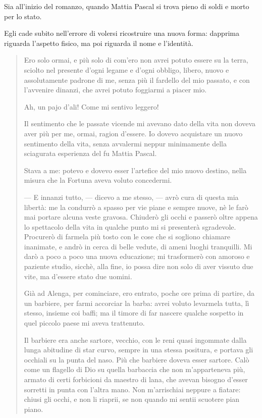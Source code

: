 \documentclass[a4paper, twoside, titlepage]{book}
\newcounter{mar}
\begin{document}
Sia all'inizio del romanzo, quando Mattia Pascal si trova pieno di soldi e morto per lo stato.

Egli cade subito nell'errore di volersi ricostruire una nuova forma: dapprima riguarda l'aspetto fisico, ma poi riguarda il nome e l'identità.

\begin{quotation}
Ero solo ormai, e più solo di com’ero non avrei potuto essere su la terra, sciolto nel presente d’ogni legame e d’ogni obbligo, libero, nuovo e assolutamente padrone di me, senza più il fardello del mio passato, e con l’avvenire dinanzi, che avrei potuto foggiarmi a piacer mio.

Ah, un pajo d’ali! Come mi sentivo leggero!

Il sentimento che le passate vicende mi avevano dato della vita non doveva aver più per me, ormai, ragion d’essere. Io dovevo acquistare un nuovo sentimento della vita, senza avvalermi neppur minimamente della sciagurata esperienza del fu Mattia Pascal.

Stava a me: potevo e dovevo esser l’artefice del mio nuovo destino, nella misura che la Fortuna aveva voluto concedermi.

— E innanzi tutto, — dicevo a me stesso, — avrò cura di questa mia libertà: me la condurrò a spasso per vie piane e sempre nuove, nè le farò mai portare alcuna veste gravosa. Chiuderò gli occhi e passerò oltre appena lo spettacolo della vita in qualche punto mi si presenterà sgradevole. Procurerò di farmela più tosto con le cose che si sogliono chiamare inanimate, e andrò in cerca di belle vedute, di ameni luoghi tranquilli. Mi darò a poco a poco una nuova educazione; mi trasformerò con amoroso e paziente studio, sicchè, alla fine, io possa dire non solo di aver vissuto due vite, ma d’essere stato due uomini.

Già ad Alenga, per cominciare, ero entrato, poche ore prima di partire, da un barbiere, per farmi accorciar la barba: avrei voluto levarmela tutta, lì stesso, insieme coi baffi; ma il timore di far nascere qualche sospetto in quel piccolo paese mi aveva trattenuto.

Il barbiere era anche sartore, vecchio, con le reni quasi ingommate dalla lunga abitudine di star curvo, sempre in una stessa positura, e portava gli occhiali su la punta del naso. Più che barbiere doveva esser sartore. Calò come un flagello di Dio su quella barbaccia che non m’apparteneva più, armato di certi forbicioni da maestro di lana, che avevan bisogno d’esser sorretti in punta con l’altra mano. Non m’arrischiai neppure a fiatare: chiusi gli occhi, e non li riaprii, se non quando mi sentii scuotere pian piano.


\end{quotation}
\end{document}
